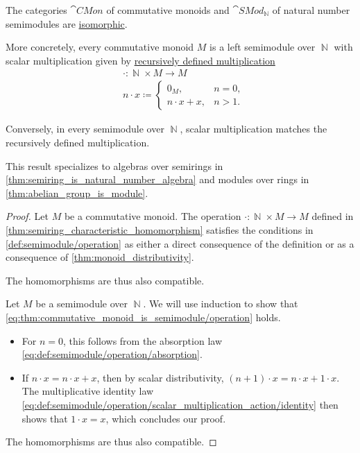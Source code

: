 \begin{proposition}\label{thm:commutative_monoid_is_semimodule}
  The categories \( \hyperref[def:monoid/category]{\cat{CMon}} \) of commutative monoids and \( \hyperref[def:semimodule/category]{\cat{SMod}_\BbbN} \) of natural number semimodules are \hyperref[rem:category_similarity/isomorphism]{isomorphic}.

  More concretely, every commutative monoid \( M \) is a left semimodule over \( \BbbN \) with scalar multiplication given by \hyperref[con:additive_semigroup/multiplication]{recursively defined multiplication}
  \begin{equation}\label{eq:thm:commutative_monoid_is_semimodule/operation}
    \begin{aligned}
      &\cdot: \BbbN \times M \to M \\
      &n \cdot x \coloneqq \begin{cases}
        0_M,           &n = 0, \\
        n \cdot x + x, &n > 1.
      \end{cases}
    \end{aligned}
  \end{equation}

  Conversely, in every semimodule over \( \BbbN \), scalar multiplication matches the recursively defined multiplication.
\end{proposition}
\begin{comments}
  \item This result specializes to algebras over semirings in \cref{thm:semiring_is_natural_number_algebra} and modules over rings in \cref{thm:abelian_group_is_module}.
\end{comments}
\begin{proof}
  \SufficiencySubProof Let \( M \) be a commutative monoid. The operation \( \cdot: \BbbN \times M \to M \) defined in \cref{thm:semiring_characteristic_homomorphism} satisfies the conditions in \cref{def:semimodule/operation} as either a direct consequence of the definition or as a consequence of \cref{thm:monoid_distributivity}.

  The homomorphisms are thus also compatible.

  \NecessitySubProof Let \( M \) be a semimodule over \( \BbbN \). We will use induction to show that \eqref{eq:thm:commutative_monoid_is_semimodule/operation} holds.
  \begin{itemize}
    \item For \( n = 0 \), this follows from the absorption law \eqref{eq:def:semimodule/operation/absorption}.
    \item If \( n \cdot x = n \cdot x + x \), then by scalar distributivity, \( (n + 1) \cdot x = n \cdot x + 1 \cdot x \). The multiplicative identity law \eqref{eq:def:semimodule/operation/scalar_multiplication_action/identity} then shows that \( 1 \cdot x = x \), which concludes our proof.
  \end{itemize}

  The homomorphisms are thus also compatible.
\end{proof}


